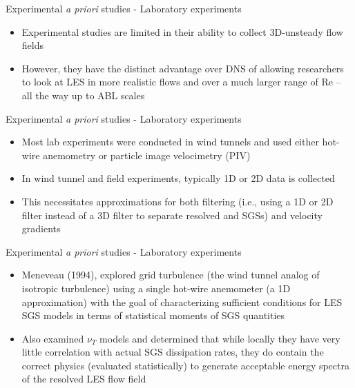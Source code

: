 
\begin{frame}{Experimental {\it a priori} studies - Laboratory experiments}
\begin{itemize}
	\item Experimental studies are limited in their ability to collect 3D-unsteady flow fields
	\item However, they have the distinct advantage over DNS of allowing researchers to look at LES in more realistic flows and over a much larger range of Re -- all the way up to ABL scales
\end{itemize}
\end{frame}


\begin{frame}{Experimental {\it a priori} studies - Laboratory experiments}
\begin{itemize}
	\item Most lab experiments were conducted in wind tunnels and used either hot-wire anemometry or particle image velocimetry (PIV)
	\item In wind tunnel and field experiments, typically 1D or 2D data is collected
	\item This necessitates approximations for both filtering (i.e., using a 1D or 2D filter instead of a 3D filter to separate resolved and SGSs) and velocity gradients
\end{itemize}
\end{frame}


\begin{frame}{Experimental {\it a priori} studies - Laboratory experiments}
\begin{itemize}
	\item Meneveau (1994), explored grid turbulence (the wind tunnel analog of isotropic turbulence) using a single hot-wire anemometer (a 1D approximation) with the goal of characterizing sufficient conditions for LES SGS models in terms of statistical moments of SGS quantities
	\item Also examined $\nu_T$ models and determined that while locally they have very little correlation with actual SGS dissipation rates, they do contain the correct physics (evaluated statistically) to generate acceptable energy spectra of the resolved LES flow field
	\end{itemize}
\end{frame}

